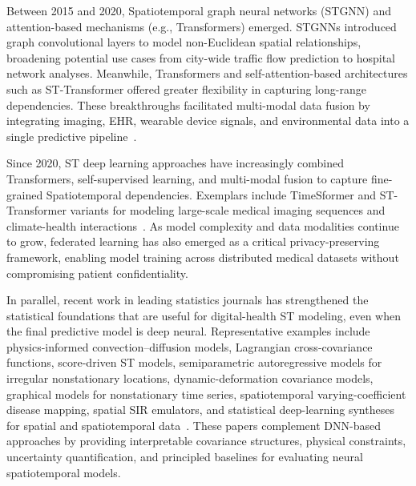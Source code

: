 \documentclass[acmsmall]{acmart}
\begin{document}
Between 2015 and 2020, Spatiotemporal graph neural networks (STGNN) and attention-based mechanisms (e.g., Transformers) emerged. STGNNs introduced graph convolutional layers to model non-Euclidean spatial relationships, broadening potential use cases from city-wide traffic flow prediction to hospital network analyses. Meanwhile, Transformers and self-attention-based architectures such as ST-Transformer offered greater flexibility in capturing long-range dependencies. These breakthroughs facilitated multi-modal data fusion by integrating imaging, EHR, wearable device signals, and environmental data into a single predictive pipeline~\cite{caroprese2018deepehr}.

Since 2020, ST deep learning approaches have increasingly combined Transformers, self-supervised learning, and multi-modal fusion to capture fine-grained Spatiotemporal dependencies. Exemplars include TimeSformer and ST-Transformer variants for modeling large-scale medical imaging sequences and climate-health interactions~\cite{liu2024temporallearning}. As model complexity and data modalities continue to grow, federated learning has also emerged as a critical privacy-preserving framework, enabling model training across distributed medical datasets without compromising patient confidentiality.

In parallel, recent work in leading statistics journals has strengthened the statistical foundations that are useful for digital-health ST modeling, even when the final predictive model is deep neural. Representative examples include physics-informed convection--diffusion models, Lagrangian cross-covariance functions, score-driven ST models, semiparametric autoregressive models for irregular nonstationary locations, dynamic-deformation covariance models, graphical models for nonstationary time series, spatiotemporal varying-coefficient disease mapping, spatial SIR emulators, and statistical deep-learning syntheses for spatial and spatiotemporal data~\cite{liu2022convectionDiffusion,salvana2023lagrangian,gasperoni2023scoreDriven,lu2024dyfast,castroMorales2025dynamicDeformation,basu2023graphicalNonstationary,wang2024respiratoryDiseaseMapping,trostle2024spatialSIR,wikle2023statisticalDeepLearning}. These papers complement DNN-based approaches by providing interpretable covariance structures, physical constraints, uncertainty quantification, and principled baselines for evaluating neural spatiotemporal models.
\end{document}
